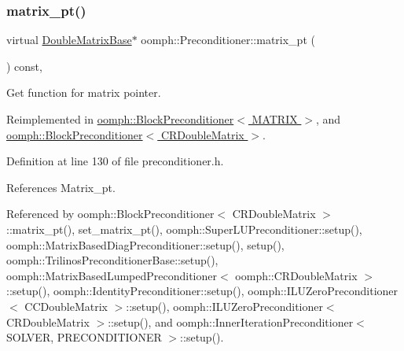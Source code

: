 \mbox{\label{classoomph_1_1Preconditioner_a66726e9df31365df646cdf83a975aa26}} 
\subsubsection{\texorpdfstring{matrix\+\_\+pt()}{matrix\_pt()}}
{\footnotesize\ttfamily virtual \hyperlink{classoomph_1_1DoubleMatrixBase}{Double\+Matrix\+Base}$\ast$ oomph\+::\+Preconditioner\+::matrix\+\_\+pt (\begin{DoxyParamCaption}{ }\end{DoxyParamCaption}) const\hspace{0.3cm}{\ttfamily [inline]}, {\ttfamily [virtual]}}



Get function for matrix pointer. 



Reimplemented in \hyperlink{classoomph_1_1BlockPreconditioner_a9aac48fd53e579e6db8eeed58933a14b}{oomph\+::\+Block\+Preconditioner$<$ M\+A\+T\+R\+I\+X $>$}, and \hyperlink{classoomph_1_1BlockPreconditioner_a9aac48fd53e579e6db8eeed58933a14b}{oomph\+::\+Block\+Preconditioner$<$ C\+R\+Double\+Matrix $>$}.



Definition at line 130 of file preconditioner.\+h.



References Matrix\+\_\+pt.



Referenced by oomph\+::\+Block\+Preconditioner$<$ C\+R\+Double\+Matrix $>$\+::matrix\+\_\+pt(), set\+\_\+matrix\+\_\+pt(), oomph\+::\+Super\+L\+U\+Preconditioner\+::setup(), oomph\+::\+Matrix\+Based\+Diag\+Preconditioner\+::setup(), setup(), oomph\+::\+Trilinos\+Preconditioner\+Base\+::setup(), oomph\+::\+Matrix\+Based\+Lumped\+Preconditioner$<$ oomph\+::\+C\+R\+Double\+Matrix $>$\+::setup(), oomph\+::\+Identity\+Preconditioner\+::setup(), oomph\+::\+I\+L\+U\+Zero\+Preconditioner$<$ C\+C\+Double\+Matrix $>$\+::setup(), oomph\+::\+I\+L\+U\+Zero\+Preconditioner$<$ C\+R\+Double\+Matrix $>$\+::setup(), and oomph\+::\+Inner\+Iteration\+Preconditioner$<$ S\+O\+L\+V\+E\+R, P\+R\+E\+C\+O\+N\+D\+I\+T\+I\+O\+N\+E\+R $>$\+::setup().

\mbox{\label{classoomph_1_1Preconditioner_a0f853396c6275cc9bc31ecd9d148d112}} 
